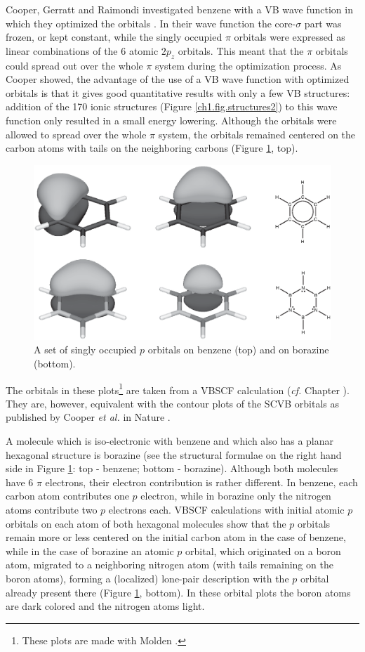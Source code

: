 Cooper, Gerratt and Raimondi investigated benzene with a VB wave function in which they optimized the orbitals \cite{nature}. In their wave function the core-$\sigma$ part was frozen, or kept constant, while the singly occupied $\pi$ orbitals were expressed as linear combinations of the 6 atomic $2p_z$ orbitals. This meant that the $\pi$ orbitals could spread out over the whole $\pi$ system during the optimization process. As Cooper showed, the advantage of the use of a VB wave function with optimized orbitals is that it gives good quantitative results with only a few VB structures: addition of the 170 ionic structures (Figure \ref{ch1.fig.structures2}) to this wave function only resulted in a small energy lowering. Although the orbitals were allowed to spread over the whole $\pi$ system, the orbitals remained centered on the carbon atoms with tails on the neighboring carbons (Figure \ref{ch1.fig6}, top). 
\begin{figure}[htbp]
\center
\includegraphics[scale=0.5]{introduction/figures/figure6.eps}
\caption{A set of singly occupied $p$ orbitals on benzene (top) and on borazine (bottom).}
\label{ch1.fig6}
\end{figure}
The orbitals in these plots\footnote{These plots are made with Molden \cite{molden}.} are taken from a VBSCF calculation (\textit{cf.} Chapter \chinorganic). They are, however, equivalent with the contour plots of the SCVB orbitals as published by Cooper \textit{et al.} in Nature \cite{nature}.

A molecule which is iso-electronic with benzene and which also has a planar hexagonal structure is borazine (see the structural formulae on the right hand side in Figure \ref{ch1.fig6}: top - benzene; bottom - borazine). Although both molecules have 6 $\pi$ electrons, their electron contribution is rather different. In benzene, each carbon atom contributes one $p$ electron, while in borazine only the nitrogen atoms contribute two $p$ electrons each. VBSCF calculations with initial atomic $p$ orbitals on each atom of both hexagonal molecules show that the $p$ orbitals remain more or less centered on the initial carbon atom in the case of benzene,  while in the case of borazine an atomic $p$ orbital, which originated on a boron atom, migrated to a neighboring nitrogen atom (with tails remaining on the boron atoms), forming a (localized) lone-pair description with the $p$ orbital already present there (Figure \ref{ch1.fig6}, bottom). In these orbital plots the boron atoms are dark colored and the nitrogen atoms light.


